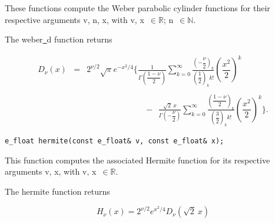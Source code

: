  These functions compute the Weber parabolic
cylinder functions for their respective arguments
{\courier v}, {\courier n}, {\courier x},
with {\courier v}, {\courier x}~$\in\mathbb{R}$;
{\courier n}~$\in\mathbb{N}$.

\vspace{6.0pt}

 The {\courier weber\underline\ d} function
returns~\cite{wolframfunctions:website}

\begin{eqnarray}
D_{\nu}(x) & = & 
2^{\nu/2}\sqrt{\pi} e^{-x^{2}/4}
\Biggl\{
\frac{1}{\Gamma\left(\dfrac{1-\nu}{2}\right)}
\sum_{k=0}^{\infty}
\frac{\left(-\dfrac{\nu}{2}\right)_{k}}{\left(\dfrac{1}{2}\right)_{k} k!}
\left(\dfrac{x^{2}}{2}\right)^{k}
\nonumber\\
\ 
\nonumber\\
& & \quad\quad\quad\quad\quad\quad\quad - \ \ 
\frac{\sqrt{2} \ x}{\Gamma\left(-\dfrac{\nu}{2}\right)}
\sum_{k=0}^{\infty}
\frac{\left(\dfrac{1-\nu}{2}\right)_{k}}{\left(\dfrac{3}{2}\right)_{k} k!}
\left(\dfrac{x^2}{2}\right)^k
\Biggr\}.
\end{eqnarray}


\begin{lstlisting}
e_float hermite(const e_float& v, const e_float& x);
\end{lstlisting}

\vspace{6.0pt}

 This function computes the associated Hermite
function for its respective arguments
{\courier v}, {\courier x}, with {\courier v}, {\courier x}~$\in\mathbb{R}$.

\vspace{6.0pt}

 The {\courier hermite} function
returns~\cite{abramowitz:textbook}

\begin{equation}
H_{\nu}(x) = 2^{\nu/2} e^{x^2/4} D_{\nu}(\sqrt{2} \ x)
\end{equation}

